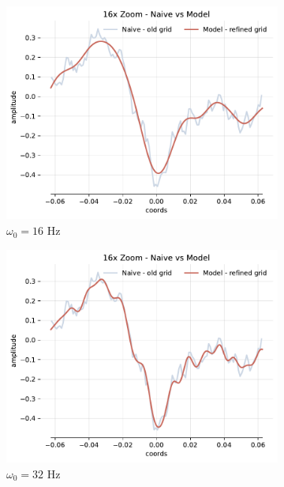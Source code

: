 \begin{figure}[h]
    \begin{subfigure}[b]{0.32\textwidth}
        \centering
        \includegraphics[width=\textwidth]{img/ch3/16x_zoom-1hl-16hf-16hz.pdf}
        \caption{$\omega_0=16$ Hz}
    \end{subfigure}
    \begin{subfigure}[b]{0.32\textwidth}
        \centering
        \includegraphics[width=\textwidth]{img/ch3/16x_zoom-1hl-16hf-32hz.pdf}
        \caption{$\omega_0=32$ Hz}
    \end{subfigure}
    \begin{subfigure}[b]{0.32\textwidth}

\end{subfigure}
\end{figure}
